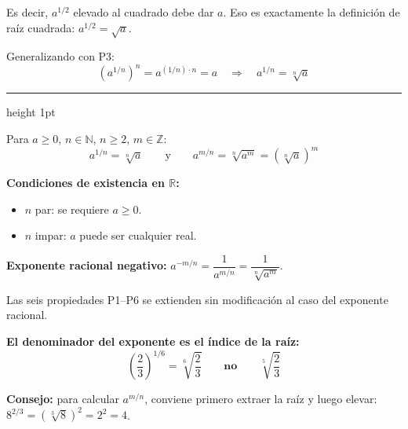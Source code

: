 \documentclass[11pt, letterpaper]{article}
\newcommand{\subbloque}[1]{%
  \vspace{14pt}
  \noindent{\large\bfseries\color{zenitnavy} #1}\par
  \vspace{4pt}\hrule height 1pt\vspace{8pt}}
\begin{document}
Es decir, $a^{1/2}$ elevado al cuadrado debe dar $a$. Eso es exactamente la definición de raíz cuadrada: $a^{1/2} = \sqrt{a}$.

Generalizando con P3:
$$(a^{1/n})^n = a^{(1/n)\cdot n} = a \quad\Longrightarrow\quad a^{1/n} = \sqrt[n]{a}$$

\begin{center}
\end{center}

\subbloque{5.2 Definición formal}
\label{sub:5.2}

\begin{tcolorbox}[importantbox, title={Potencia de exponente racional}]
Para $a \geq 0$, $n \in \mathbb{N}$, $n \geq 2$, $m \in \mathbb{Z}$:
$$\boxed{a^{1/n} = \sqrt[n]{a}} \qquad\text{y}\qquad \boxed{a^{m/n} = \sqrt[n]{a^m} = \left(\sqrt[n]{a}\right)^m}$$

\textbf{Condiciones de existencia en $\mathbb{R}$:}
\begin{itemize}[itemsep=3pt]
  \item $n$ par: se requiere $a \geq 0$.
  \item $n$ impar: $a$ puede ser cualquier real.
\end{itemize}

\textbf{Exponente racional negativo:} $a^{-m/n} = \dfrac{1}{a^{m/n}} = \dfrac{1}{\sqrt[n]{a^m}}$.

Las seis propiedades P1--P6 se extienden sin modificación al caso del exponente racional.
\end{tcolorbox}

\begin{tcolorbox}[warningbox, title={Error frecuente — leer mal el exponente}]
\textbf{El denominador del exponente es el índice de la raíz:}
$$\left(\frac{2}{3}\right)^{1/6} = \sqrt[6]{\frac{2}{3}} \qquad\textbf{no}\qquad \sqrt[5]{\frac{2}{3}}$$

\textbf{Consejo:} para calcular $a^{m/n}$, conviene primero extraer la raíz y luego elevar: $8^{2/3} = (\sqrt[3]{8})^2 = 2^2 = 4$.
\end{tcolorbox}
\end{document}
